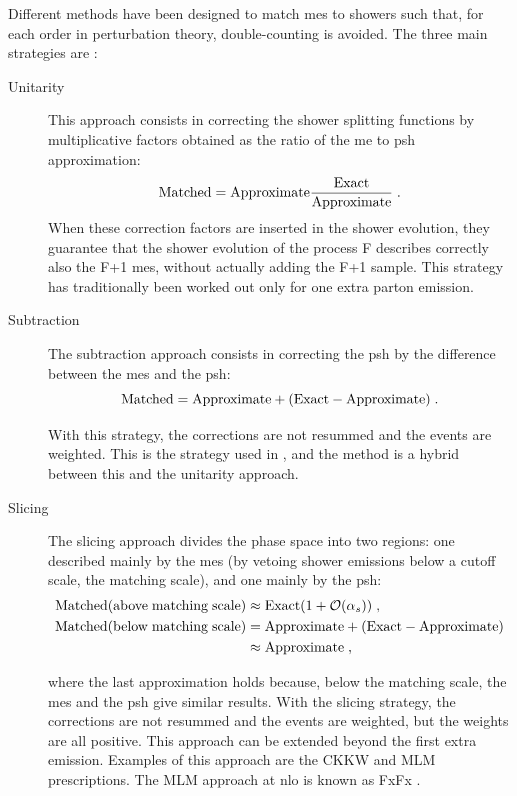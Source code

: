 Different methods have been designed to match \glspl{me} to showers such that, for each order in perturbation theory, double-counting is avoided. The three main strategies are \cite{Giele:2011cb}:
\begin{description}
\item[Unitarity] This approach consists in correcting the shower splitting functions by multiplicative factors obtained as the ratio of the \gls{me} to \gls{psh} approximation:
$$
\rm{Matched} = \rm{Approximate}\frac{\rm{Exact}}{Approximate} \; .
$$
\noindent When these correction factors are inserted in the shower evolution, they guarantee that the shower evolution of the process F describes correctly also the F+1 \glspl{me}, without actually adding the F+1 sample. This strategy has traditionally been worked out only for one extra parton emission. 

\item[Subtraction] The subtraction approach consists in correcting the \gls{psh} by the difference between the \glspl{me} and the \gls{psh}:
$$
\rm{Matched} = \rm{Approximate} + (\rm{Exact}- \rm{Approximate}) \; .
$$

\noindent With this strategy, the corrections are not resummed and the events are weighted. This is the strategy used in \mcatnlo \cite{Frixione:2002ik,Frixione:2003ei,Frixione:2008ym}, and the \Powheg method \cite{Frixione:2007vw} is a hybrid between this and the unitarity approach.

\item[Slicing] The slicing approach divides the phase space into two regions: one described mainly by the \glspl{me} (by vetoing shower emissions below a cutoff scale, the matching scale), and one mainly by the \gls{psh}:
\begin{equation*}
\begin{split}
 {\rm{Matched (above \; matching \;  scale)}} &\approx {\rm{Exact}} (1 + {\mathcal{O}} ( \alpha_s)) \; , \\
{\rm{Matched (below \; matching \;  scale)} } &= {\rm{Approximate}} + ({\rm{Exact}}- {\rm{Approximate}})  \\
& \approx {\rm{Approximate}}    \; ,
\end{split}
\end{equation*}


\noindent where the last approximation holds because, below the matching scale, the \glspl{me} and the \gls{psh} give similar results. 
With the slicing strategy, the corrections are not resummed and the events are weighted, but the weights are all positive. This approach can be extended beyond the first extra emission. 
Examples of this approach are the CKKW \cite{Catani:2001cc} and MLM \cite{Mangano:2006rw,Mrenna:2003if} prescriptions. The MLM approach at \gls{nlo} is known as FxFx \cite{Frederix:2012ps}. 

\end{description}


